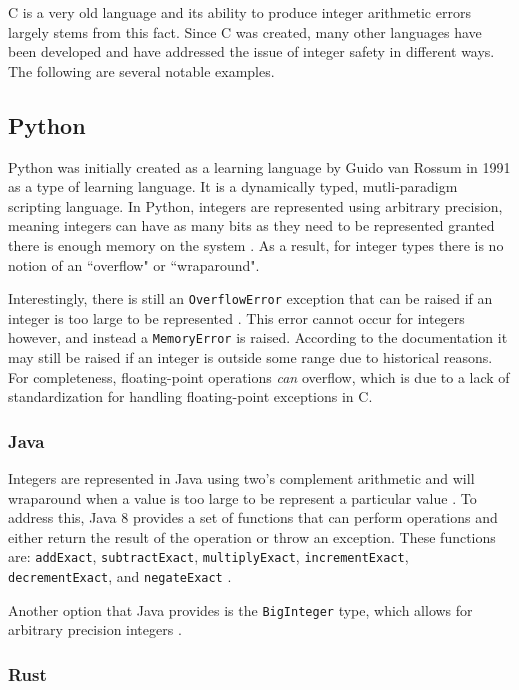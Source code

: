 C is a very old language and its ability to produce integer arithmetic errors largely stems from this fact. Since C was created, many other languages have been developed and have addressed the issue of integer safety in different ways. The following are several notable examples.

\subsection{Python}

Python was initially created as a learning language by Guido van Rossum in 1991 as a type of learning language. It is a dynamically typed, mutli-paradigm scripting language. In Python, integers are represented using arbitrary precision, meaning integers can have as many bits as they need to be represented granted there is enough memory on the system \cite{python_types}. As a result, for integer types there is no notion of an ``overflow" or ``wraparound".

Interestingly, there is still an \texttt{OverflowError} exception that can be raised if an integer is too large to be represented \cite{python_overflow}. This error cannot occur for integers however, and instead a \texttt{MemoryError} is raised. According to the documentation it may still be raised if an integer is outside some range due to historical reasons. For completeness, floating-point operations \textit{can} overflow, which is due to a lack of standardization for handling floating-point exceptions in C.

\subsubsection{Java}

Integers are represented in Java using two's complement arithmetic and will wraparound when a value is too large to be represent a particular value \cite{java_int}. To address this, Java 8 provides a set of functions that can perform operations and either return the result of the operation or throw an exception. These functions are: \texttt{addExact}, \texttt{subtractExact}, \texttt{multiplyExact}, \texttt{incrementExact}, \texttt{decrementExact}, and \texttt{negateExact} \cite{java_exact}.

Another option that Java provides is the \texttt{BigInteger} type, which allows for arbitrary precision integers \cite{bigint}.

\subsubsection{Rust}

